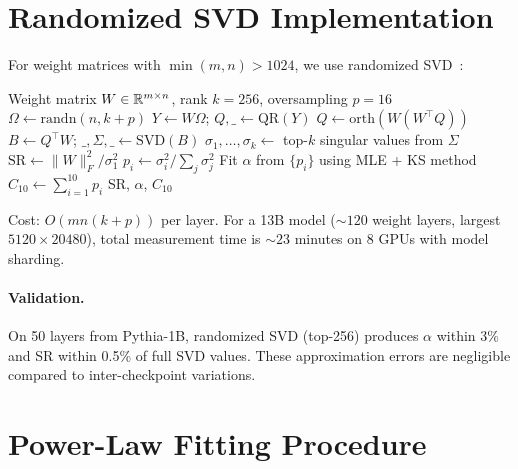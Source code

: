 \section{Randomized SVD Implementation}
\label{app:svd}

For weight matrices with $\min(m,n) > 1024$, we use randomized SVD~\citep{halko2011}:

\begin{algorithm}[t]
\caption{Spectral metric computation for one weight layer}
\label{alg:svd}
\begin{algorithmic}[1]
\REQUIRE Weight matrix $W \in \mathbb{R}^{m \times n}$, rank $k = 256$, oversampling $p = 16$
\STATE $\Omega \leftarrow \mathrm{randn}(n, k+p)$ 
\STATE $Y \leftarrow W\Omega$; \quad $Q, \_ \leftarrow \mathrm{QR}(Y)$
\STATE $Q \leftarrow \mathrm{orth}(W(W^\top Q))$ 
\STATE $B \leftarrow Q^\top W$; \quad $\_, \Sigma, \_ \leftarrow \mathrm{SVD}(B)$
\STATE $\sigma_1, \ldots, \sigma_k \leftarrow$ top-$k$ singular values from $\Sigma$
\STATE $\mathrm{SR} \leftarrow \|W\|_F^2 / \sigma_1^2$ 
\STATE $p_i \leftarrow \sigma_i^2 / \sum_j \sigma_j^2$
\STATE Fit $\alpha$ from $\{p_i\}$ using MLE + KS method
\STATE $C_{10} \leftarrow \sum_{i=1}^{10} p_i$
\RETURN SR, $\alpha$, $C_{10}$
\end{algorithmic}
\end{algorithm}

Cost: $O(mn(k+p))$ per layer. For a 13B model (${\sim}120$ weight layers, largest $5120 \times 20480$), total measurement time is ${\sim}23$ minutes on 8 GPUs with model sharding.

\paragraph{Validation.} On 50 layers from Pythia-1B, randomized SVD (top-256) produces $\alpha$ within 3\% and SR within 0.5\% of full SVD values. These approximation errors are negligible compared to inter-checkpoint variations.

\section{Power-Law Fitting Procedure}
\label{app:alpha_fit}

